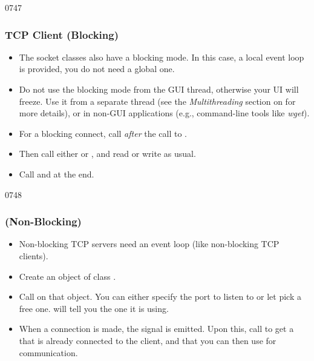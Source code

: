 \begin{slide}[fragile]{0747}
\frametitle{TCP Client (Blocking)}
  \begin{itemize}
        \item The socket classes also have a blocking mode. In this
        case, a local event loop is provided, you do not need a global
        one.
        \item Do not use the blocking mode from the GUI thread,
        otherwise your UI will freeze. Use it from a separate thread
          (see the \emph{Multithreading} section on
           for more details),
        or in non-GUI applications (e.g., command-line tools like
        \textit{wget}).
        \item For a blocking connect, call
          \emph{after} the
        call to .
        \item Then call either  or
        , and read or write as usual.
        \item Call  and
         at the end.
  \end{itemize}
\end{slide}

\begin{slide}{0748}
\frametitle{ (Non-Blocking)}
  \begin{itemize}
  \item Non-blocking TCP servers need an event loop (like non-blocking
        TCP clients).
  \item Create an object of class .
  \item Call  on that object. You can either specify
        the port to listen to or let  pick a free
        one.  will tell you the one it is using.
  \item When a connection is made, the  signal
        is emitted. Upon this, call 
        to get a  that is already connected to the
        client, and that you can then use for communication.
  \end{itemize}
\end{slide}

